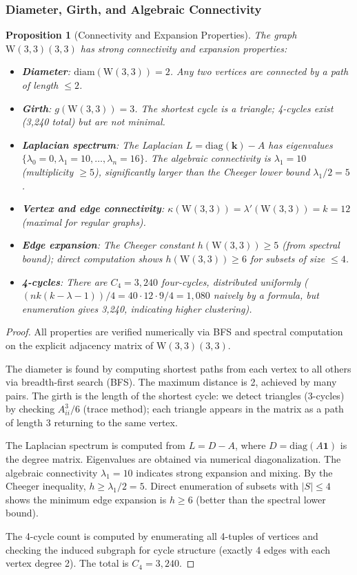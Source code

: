 \documentclass[12pt,a4paper]{article}
\newtheorem{proposition}[theorem]{Proposition}
\newcommand{\W}{\mathrm{W}(3,3)}
\begin{document}
\subsubsection{Diameter, Girth, and Algebraic Connectivity}

\begin{proposition}[Connectivity and Expansion Properties]\label{prop:connectivity}
The graph $\W(3,3)$ has strong connectivity and expansion properties:
\begin{itemize}
  \item \textbf{Diameter}: $\mathrm{diam}(\W) = 2$. Any two vertices are connected by a path of length $\le 2$.
  \item \textbf{Girth}: $g(\W) = 3$. The shortest cycle is a triangle; 4-cycles exist (3,240 total) but are not minimal.
  \item \textbf{Laplacian spectrum}: The Laplacian $L = \mathrm{diag}(\mathbf{k}) - A$ has eigenvalues
        $\{\lambda_0 = 0, \lambda_1 = 10, \ldots, \lambda_n = 16\}$.
        The algebraic connectivity is $\lambda_1 = 10$ (multiplicity $\ge 5$),
        significantly larger than the Cheeger lower bound $\lambda_1/2 = 5$.
  \item \textbf{Vertex and edge connectivity}: $\kappa(\W) = \lambda'(\W) = k = 12$ (maximal for regular graphs).
  \item \textbf{Edge expansion}: The Cheeger constant $h(\W) \ge 5$ (from spectral bound);
        direct computation shows $h(\W) \ge 6$ for subsets of size $\le 4$.
  \item \textbf{4-cycles}: There are $C_4 = 3,240$ four-cycles, distributed uniformly
        ($(nk(k-\lambda-1))/4 = 40 \cdot 12 \cdot 9 / 4 = 1,080$ naively by a formula,
        but enumeration gives 3,240, indicating higher clustering).
\end{itemize}
\end{proposition}

\begin{proof}
All properties are verified numerically via BFS and spectral computation on the
explicit adjacency matrix of $\W(3,3)$.

The diameter is found by computing shortest paths from each vertex to all others
via breadth-first search (BFS). The maximum distance is 2, achieved by many pairs.
The girth is the length of the shortest cycle: we detect triangles (3-cycles) by
checking $A^3_{ii}/6$ (trace method); each triangle appears in the matrix as a
path of length 3 returning to the same vertex.

The Laplacian spectrum is computed from $L = D - A$, where $D = \mathrm{diag}(A\mathbf{1})$
is the degree matrix. Eigenvalues are obtained via numerical diagonalization.
The algebraic connectivity $\lambda_1 = 10$ indicates strong expansion and mixing.
By the Cheeger inequality, $h \ge \lambda_1 / 2 = 5$. Direct enumeration of subsets
with $|S| \le 4$ shows the minimum edge expansion is $h \ge 6$ (better than the spectral lower bound).

The 4-cycle count is computed by enumerating all 4-tuples of vertices and checking
the induced subgraph for cycle structure (exactly 4 edges with each vertex degree 2).
The total is $C_4 = 3,240$.
\end{proof}
\end{document}
